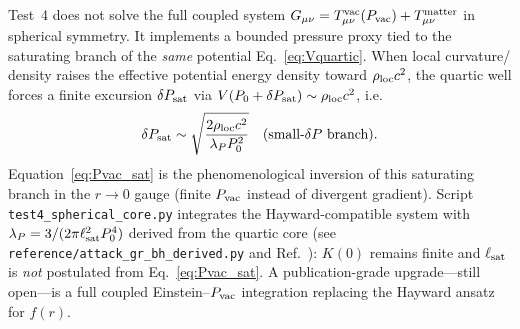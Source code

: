 \documentclass[prd,
               reprint,
               aps,
               preprintnumbers,
               nofootinbib,
               longbibliography,
               floatfix]{revtex4-2}
\begin{document}
Test~4 does not solve the full coupled system
$G_{\mu\nu}=T_{\mu\nu}^{\rm vac}(P_{\rm vac})+T_{\mu\nu}^{\rm matter}$
in spherical symmetry.
It implements a bounded pressure proxy tied to the saturating branch of
the \emph{same} potential Eq.~\eqref{eq:Vquartic}.
When local curvature/ density raises the effective potential energy density
toward $\rho_{\rm loc}c^2$, the quartic well forces a finite excursion
$\delta P_{\rm sat}$ via
$V(P_0+\delta P_{\rm sat})\sim\rho_{\rm loc}c^2$, i.e.\
\begin{equation}
\label{eq:P_sat_from_V}
\delta P_{\rm sat}
\sim
\sqrt{\frac{2\rho_{\rm loc}c^2}{\lambda_P P_0^2}}
\quad
(\text{small-}\delta P\text{ branch}).
\end{equation}
Equation~\eqref{eq:Pvac_sat} is the phenomenological inversion of this
saturating branch in the $r\to 0$ gauge (finite $P_{\rm vac}$ instead of
divergent gradient).
Script \texttt{test4\_spherical\_core.py} integrates the Hayward-compatible
system with $\lambda_P=3/(2\pi\ell_{\rm sat}^2 P_0^4)$ derived from the
quartic core (see \texttt{reference/attack\_gr\_bh\_derived.py} and
Ref.~\cite{Hayward2006}):
$K(0)$ remains finite and $\ell_{\rm sat}$ is \emph{not} postulated from
Eq.~\eqref{eq:Pvac_sat}.
A publication-grade upgrade---still open---is a full coupled
Einstein--$P_{\rm vac}$ integration replacing the Hayward ansatz for $f(r)$.
\end{document}
